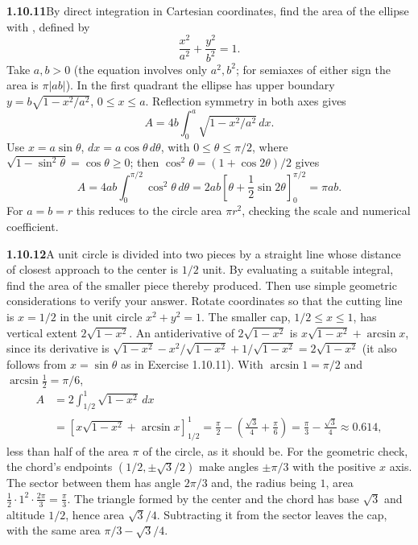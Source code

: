 \par\bigskip
\noindent\textbf{1.10.11}\quad By direct integration in Cartesian coordinates,
find the area of the ellipse with , defined by
\[
\frac{x^{2}}{a^{2}}+\frac{y^{2}}{b^{2}}=1.
\]
\solution
Take $a,b>0$ (the equation involves only $a^2,b^2$; for semiaxes of
either sign the area is $\pi|ab|$). In the first quadrant the ellipse
has upper boundary
$y=b\sqrt{1-x^2/a^2}$, $0\le x\le a$. Reflection symmetry in both axes
gives
\[
 A=4b\int_0^a\sqrt{1-x^2/a^2}\,dx.
\]
Use $x=a\sin\theta$, $dx=a\cos\theta\,d\theta$, with
$0\le\theta\le\pi/2$, where $\sqrt{1-\sin^2\theta}=\cos\theta\ge0$;
then $\cos^2\theta=(1+\cos2\theta)/2$ gives
\[
 A=4ab\int_0^{\pi/2}\cos^2\theta\,d\theta
  =2ab\left[\theta+\frac12\sin2\theta\right]_0^{\pi/2}
  =\boxed{\pi ab}.
\]
For $a=b=r$ this reduces to the circle area $\pi r^2$, checking the
scale and numerical coefficient.


\par\bigskip
\noindent\textbf{1.10.12}\quad A unit circle is divided into two pieces by a
straight line whose distance of closest approach to the center is $1/2$ unit.
By evaluating a suitable integral, find the area of the smaller piece thereby
produced. Then use simple geometric considerations to verify your answer.
\solution
Rotate coordinates so that the cutting line is $x=1/2$ in the unit
circle $x^2+y^2=1$. The smaller cap, $1/2\le x\le1$, has vertical
extent $2\sqrt{1-x^2}$. An antiderivative of $2\sqrt{1-x^2}$ is
$x\sqrt{1-x^2}+\arcsin x$, since its derivative is
$\sqrt{1-x^2}-x^2/\sqrt{1-x^2}+1/\sqrt{1-x^2}=2\sqrt{1-x^2}$ (it also
follows from $x=\sin\theta$ as in Exercise 1.10.11). With
$\arcsin1=\pi/2$ and $\arcsin\frac12=\pi/6$,
\[
 \begin{aligned}
 A&=2\int_{1/2}^1\sqrt{1-x^2}\,dx\\
  &=\left[x\sqrt{1-x^2}+\arcsin x\right]_{1/2}^1
   =\frac\pi2-\left(\frac{\sqrt3}4+\frac\pi6\right)
   =\boxed{\frac\pi3-\frac{\sqrt3}4}\approx0.614,
 \end{aligned}
\]
less than half of the area $\pi$ of the circle, as it should be.
For the geometric check, the chord's endpoints $(1/2,\pm\sqrt3/2)$
make angles $\pm\pi/3$ with the positive $x$ axis. The sector between
them has angle $2\pi/3$ and, the radius being $1$, area
$\frac12\cdot1^2\cdot\frac{2\pi}3=\frac\pi3$. The triangle
formed by the center and the chord has base $\sqrt3$ and altitude
$1/2$, hence area $\sqrt3/4$. Subtracting it from the sector leaves
the cap, with the same area $\pi/3-\sqrt3/4$.


